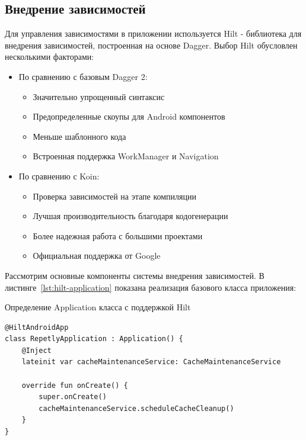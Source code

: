 \documentclass[14pt, russian]{scrartcl}
\begin{document}
\subsection{Внедрение зависимостей}\label{sect:di}

Для управления зависимостями в приложении используется Hilt - библиотека для внедрения зависимостей, построенная на основе Dagger. Выбор Hilt обусловлен несколькими факторами:

\begin{itemize}
\item По сравнению с базовым Dagger 2:
  \begin{itemize}
  \item Значительно упрощенный синтаксис
  \item Предопределенные скоупы для Android компонентов
  \item Меньше шаблонного кода
  \item Встроенная поддержка WorkManager и Navigation
  \end{itemize}
\item По сравнению с Koin:
  \begin{itemize}
  \item Проверка зависимостей на этапе компиляции
  \item Лучшая производительность благодаря кодогенерации
  \item Более надежная работа с большими проектами
  \item Официальная поддержка от Google
  \end{itemize}
\end{itemize}

Рассмотрим основные компоненты системы внедрения зависимостей. В листинге~\ref{lst:hilt-application} показана реализация базового класса приложения:

\begin{listing}[!htb]
\caption{Определение Application класса с поддержкой Hilt}
\label{lst:hilt-application}
\begin{verbatim}
@HiltAndroidApp
class RepetlyApplication : Application() {
    @Inject
    lateinit var cacheMaintenanceService: CacheMaintenanceService

    override fun onCreate() {
        super.onCreate()
        cacheMaintenanceService.scheduleCacheCleanup()
    }
}
\end{verbatim}
\end{listing}
\end{document}
